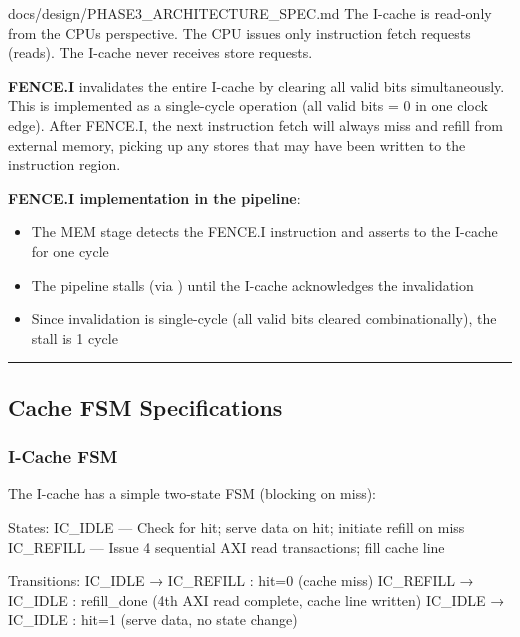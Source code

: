 \begin{relocated}{docs/design/PHASE3_ARCHITECTURE_SPEC.md}
The I-cache is read-only from the CPU\textquotesingle s perspective. The
CPU issues only instruction fetch requests (reads). The I-cache never
receives store requests.

\textbf{FENCE.I} invalidates the entire I-cache by clearing all valid
bits simultaneously. This is implemented as a single-cycle operation
(all valid bits = 0 in one clock edge). After FENCE.I, the next
instruction fetch will always miss and refill from external memory,
picking up any stores that may have been written to the instruction
region.

\textbf{FENCE.I implementation in the pipeline}:

\begin{itemize}
\tightlist
\item
  The  MEM stage detects the FENCE.I
  instruction and asserts  to the I-cache for one
  cycle
\item
  The pipeline stalls (via ) until the I-cache
  acknowledges the invalidation
\item
  Since invalidation is single-cycle (all valid bits cleared
  combinationally), the stall is 1 cycle
\end{itemize}

\begin{center}\rule{0.5\linewidth}{0.5pt}\end{center}

\subsection{Cache FSM Specifications}\label{ds:ch:phase3-architecture:3-cache-fsm-specifications}

\subsubsection{I-Cache FSM}\label{ds:ch:phase3-architecture:31-i-cache-fsm}

The I-cache has a simple two-state FSM (blocking on miss):

\begin{textblock}
States:
  IC_IDLE   — Check for hit; serve data on hit; initiate refill on miss
  IC_REFILL — Issue 4 sequential AXI read transactions; fill cache line

Transitions:
  IC_IDLE → IC_REFILL  : hit=0 (cache miss)
  IC_REFILL → IC_IDLE  : refill_done (4th AXI read complete, cache line written)
  IC_IDLE → IC_IDLE    : hit=1 (serve data, no state change)
\end{textblock}


\end{relocated}
